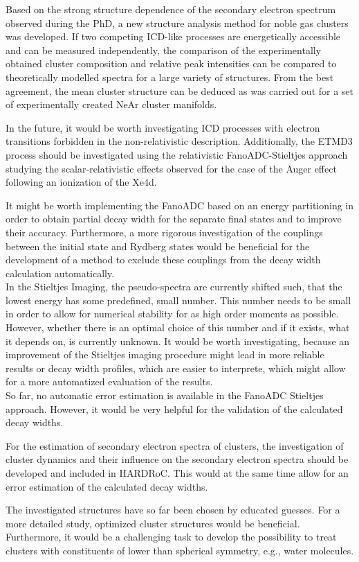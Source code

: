 Based on the strong structure dependence of the secondary electron spectrum
observed during the PhD, a new
structure analysis method for noble gas clusters was developed. If two
competing ICD-like processes are energetically accessible and can be measured
independently, the comparison of the experimentally obtained cluster
composition and relative peak intensities can be compared to theoretically
modelled spectra for a large variety of structures. From the best agreement,
the mean cluster structure can be deduced as was carried out for
a set of experimentally created NeAr cluster manifolds.

In the future, it would be worth investigating \ac{ICD} processes with electron
transitions forbidden in the non-relativistic description.
Additionally, the ETMD3 process should be investigated using the relativistic
FanoADC-Stieltjes approach studying the scalar-relativistic effects observed
for the case of the Auger effect following an ionization of the Xe4d.

It might be worth implementing the FanoADC based on an energy partitioning in
order to obtain partial decay width for the separate final states and to
improve their accuracy.
Furthermore, a more rigorous investigation of the couplings between the
initial state and Rydberg states would be beneficial for the development
of a method to exclude these couplings from the decay width calculation
automatically.\\
In the Stieltjes Imaging, the pseudo-spectra are currently shifted such,
that the lowest energy has some predefined, small number. This number needs
to be small in order to allow for numerical stability for as high order
moments as possible. However, whether there is an optimal choice of this
number and if it exists, what it depends on, is currently unknown.
It would be worth investigating, because an improvement of the Stieltjes
imaging procedure might lead in more reliable results or decay width profiles,
which are easier to interprete, which might allow for a more automatized
evaluation of the results.\\
So far, no automatic error estimation is available in the FanoADC Stieltjes
approach. However, it would be very helpful for the validation of the
calculated decay widths.

For the estimation of secondary electron spectra of clusters,
the investigation of cluster dynamics and their influence on the
secondary electron spectra should be developed and included in
HARDRoC. This would at the same time allow for an error estimation of
the calculated decay widths.

The investigated structures have so far been chosen by educated guesses.
For a more detailed study, optimized cluster structures would be beneficial.
Furthermore, it would be a challenging task to develop the possibility to
treat clusters with constituents of lower than spherical symmetry, e.g.,
water molecules.
